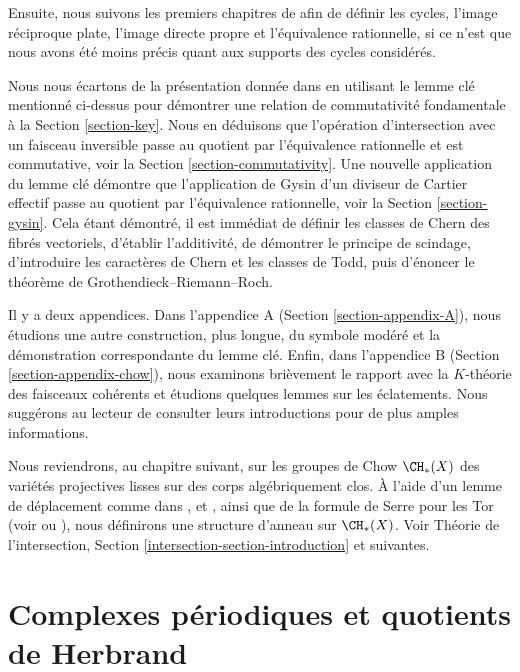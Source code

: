 \medskip\noindent
Ensuite, nous suivons les premiers chapitres de \cite{F} afin de définir
les cycles, l'image réciproque plate, l'image directe propre et l'équivalence rationnelle,
si ce n'est que nous avons été moins précis quant aux supports des cycles
considérés.

\medskip\noindent
Nous nous écartons de la présentation donnée dans \cite{F} en utilisant le
lemme clé mentionné ci-dessus pour démontrer une relation de commutativité fondamentale à la
Section \ref{section-key}. Nous en déduisons que l'opération
d'intersection avec un faisceau inversible passe au quotient par l'équivalence
rationnelle et est commutative, voir la Section \ref{section-commutativity}.
Une nouvelle application du lemme
clé démontre que l'application de Gysin d'un diviseur de Cartier effectif
passe au quotient par l'équivalence rationnelle, voir la Section \ref{section-gysin}.
Cela étant démontré, il est immédiat de définir les classes de Chern
des fibrés vectoriels, d'établir l'additivité, de démontrer le principe de scindage,
d'introduire les caractères de Chern et les classes de Todd, puis d'énoncer le
théorème de Grothendieck--Riemann--Roch.

\medskip\noindent
Il y a deux appendices. Dans l'appendice A (Section \ref{section-appendix-A}),
nous étudions une autre construction, plus longue, du
symbole modéré et la démonstration correspondante du lemme clé.
Enfin, dans l'appendice B (Section \ref{section-appendix-chow}),
nous examinons brièvement le rapport avec la $K$-théorie des faisceaux
cohérents et étudions quelques lemmes sur les éclatements.
Nous suggérons au lecteur de consulter leurs introductions pour
de plus amples informations.

\medskip\noindent
Nous reviendrons, au chapitre suivant, sur les groupes de Chow $\CH_*(X)$ des variétés projectives lisses
sur des corps algébriquement clos. À l'aide d'un lemme de déplacement
comme dans \cite{Samuel}, \cite{ChevalleyI} et \cite{ChevalleyII},
ainsi que de la formule de Serre pour les Tor
(voir \cite{Serre_local_algebra} ou \cite{Serre_algebre_locale}),
nous définirons une structure d'anneau sur $\CH_*(X)$. Voir
Théorie de l'intersection, Section \ref{intersection-section-introduction} et suivantes.








\section{Complexes périodiques et quotients de Herbrand}
\label{section-periodic-complexes}

